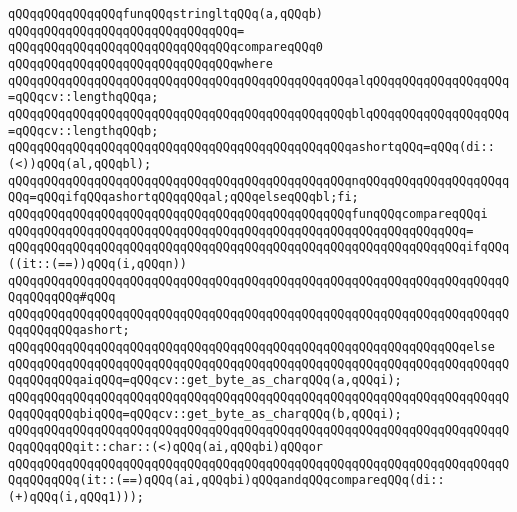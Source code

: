 \newline
\verb|qQQqqQQqqQQqqQQqfunqQQqstringltqQQq(a,qQQqb)|\newline
\verb|qQQqqQQqqQQqqQQqqQQqqQQqqQQqqQQq=|\newline
\verb|qQQqqQQqqQQqqQQqqQQqqQQqqQQqqQQqcompareqQQq0|\newline
\verb|qQQqqQQqqQQqqQQqqQQqqQQqqQQqqQQqwhere|\newline
\verb|qQQqqQQqqQQqqQQqqQQqqQQqqQQqqQQqqQQqqQQqqQQqqQQqalqQQqqQQqqQQqqQQqqQQq=qQQqcv::lengthqQQqa;|\newline
\verb|qQQqqQQqqQQqqQQqqQQqqQQqqQQqqQQqqQQqqQQqqQQqqQQqblqQQqqQQqqQQqqQQqqQQq=qQQqcv::lengthqQQqb;|\newline
\newline
\verb|qQQqqQQqqQQqqQQqqQQqqQQqqQQqqQQqqQQqqQQqqQQqqQQqashortqQQq=qQQq(di::(<))qQQq(al,qQQqbl);|\newline
\newline
\verb|qQQqqQQqqQQqqQQqqQQqqQQqqQQqqQQqqQQqqQQqqQQqqQQqnqQQqqQQqqQQqqQQqqQQqqQQq=qQQqifqQQqashortqQQqqQQqal;qQQqelseqQQqbl;fi;|\newline
\newline
\verb|qQQqqQQqqQQqqQQqqQQqqQQqqQQqqQQqqQQqqQQqqQQqqQQqfunqQQqcompareqQQqi|\newline
\verb|qQQqqQQqqQQqqQQqqQQqqQQqqQQqqQQqqQQqqQQqqQQqqQQqqQQqqQQqqQQqqQQq=|\newline
\verb|qQQqqQQqqQQqqQQqqQQqqQQqqQQqqQQqqQQqqQQqqQQqqQQqqQQqqQQqqQQqqQQqifqQQq((it::(==))qQQq(i,qQQqn))|\newline
\verb|qQQqqQQqqQQqqQQqqQQqqQQqqQQqqQQqqQQqqQQqqQQqqQQqqQQqqQQqqQQqqQQqqQQqqQQqqQQqqQQq#qQQq|\newline
\verb|qQQqqQQqqQQqqQQqqQQqqQQqqQQqqQQqqQQqqQQqqQQqqQQqqQQqqQQqqQQqqQQqqQQqqQQqqQQqqQQqashort;|\newline
\verb|qQQqqQQqqQQqqQQqqQQqqQQqqQQqqQQqqQQqqQQqqQQqqQQqqQQqqQQqqQQqqQQqelse|\newline
\verb|qQQqqQQqqQQqqQQqqQQqqQQqqQQqqQQqqQQqqQQqqQQqqQQqqQQqqQQqqQQqqQQqqQQqqQQqqQQqqQQqaiqQQq=qQQqcv::get_byte_as_charqQQq(a,qQQqi);|\newline
\verb|qQQqqQQqqQQqqQQqqQQqqQQqqQQqqQQqqQQqqQQqqQQqqQQqqQQqqQQqqQQqqQQqqQQqqQQqqQQqqQQqbiqQQq=qQQqcv::get_byte_as_charqQQq(b,qQQqi);|\newline
\newline
\verb|qQQqqQQqqQQqqQQqqQQqqQQqqQQqqQQqqQQqqQQqqQQqqQQqqQQqqQQqqQQqqQQqqQQqqQQqqQQqqQQqit::char::(<)qQQq(ai,qQQqbi)qQQqor|\newline
\verb|qQQqqQQqqQQqqQQqqQQqqQQqqQQqqQQqqQQqqQQqqQQqqQQqqQQqqQQqqQQqqQQqqQQqqQQqqQQqqQQq(it::(==)qQQq(ai,qQQqbi)qQQqandqQQqcompareqQQq(di::(+)qQQq(i,qQQq1)));|\newline
